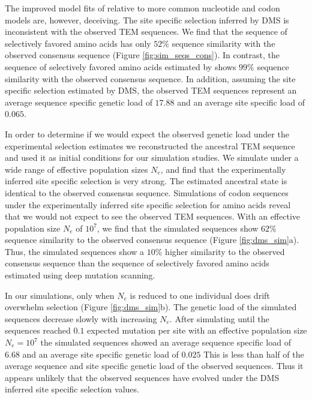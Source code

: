 The improved model fits of \phydms relative to more common nucleotide and codon models are, however, deceiving.
The site specific selection inferred by DMS is inconsistent with the observed TEM sequences.
We find that the sequence of selectively favored amino acids has only $52 \%$ sequence similarity with the observed consensus sequence (Figure \ref{fig:sim_seqs_cons}).
In contrast, the sequence of selectively favored amino acids estimated by \selac shows $99 \%$ sequence similarity with the observed consensus sequence.
In addition, assuming the site specific selection estimated by DMS, the observed TEM sequences represent an average sequence specific genetic load of $17.88$ and an average site specific load of $0.065$.

In order to determine if we would expect the observed genetic load under the experimental selection estimates we reconstructed the ancestral TEM sequence and used it as initial conditions for our simulation studies.
We simulate under a wide range of effective population sizes $N_e$, and find that the experimentally inferred site specific selection is very strong.
The estimated ancestral state is identical to the observed consensus sequence.
Simulations of codon sequences under the experimentally inferred site specific selection for amino acids reveal that we would not expect to see the observed TEM sequences.
With an effective population size $N_e$ of $10^7$, we find that the simulated sequences show $62 \%$ sequence similarity to the observed consensus sequence (Figure \ref{fig:dms_sim}a).
Thus, the simulated sequences show a $10 \%$ higher similarity to the observed consensus sequence than the sequence of selectively favored amino acids estimated using deep mutation scanning.

In our simulations, only when $N_e$ is reduced to one individual does drift overwhelm selection (Figure \ref{fig:dms_sim}b).
The genetic load of the simulated sequences decrease slowly with increasing $N_e$.
After simulating until the sequences reached $0.1$ expected mutation per site with an effective population size $N_e = 10^7$ the simulated sequences showed an average sequence specific load of $6.68$ and an average site specific genetic load of $0.025$
This is less than half of the average sequence and site specific genetic load of the observed sequences.
Thus it appears unlikely that the observed sequences have evolved under the DMS inferred site specific selection values.

